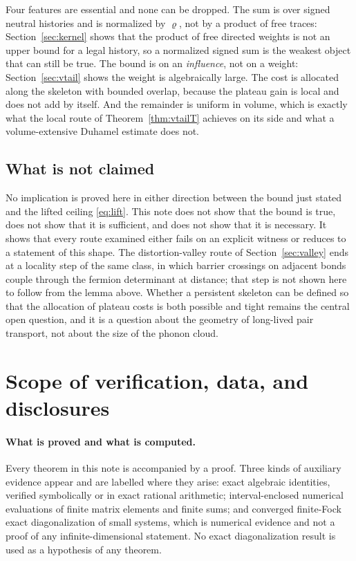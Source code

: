 \documentclass[11pt]{article}
\theoremstyle{definition}
\theoremstyle{remark}
\begin{document}
Four features are essential and none can be dropped. The sum is over signed
neutral histories and is normalized by $\varrho$, not by a product of free traces:
Section~\ref{sec:kernel} shows that the product of free directed weights is not an
upper bound for a legal history, so a normalized signed sum is the weakest object
that can still be true. The bound is on an \emph{influence}, not on a weight:
Section~\ref{sec:vtail} shows the weight is algebraically large. The cost is
allocated along the skeleton with bounded overlap, because the plateau gain is
local and does not add by itself. And the remainder is uniform in volume, which is
exactly what the local route of Theorem~\ref{thm:vtailT} achieves on its side and
what a volume-extensive Duhamel estimate does not.

\subsection{What is not claimed}

No implication is proved here in either direction between the bound just stated
and the lifted ceiling \eqref{eq:lift}. This note does not show that the bound is
true, does not show that it is sufficient, and does not show that it is necessary.
It shows that every route examined either fails on an explicit witness or reduces
to a statement of this shape. The distortion-valley route of
Section~\ref{sec:valley} ends at a locality step of the same class, in which
barrier crossings on adjacent bonds couple through the fermion determinant at
distance; that step is not shown here to follow from the lemma above. Whether a
persistent skeleton can be defined so that
the allocation of plateau costs is both possible and tight remains the central
open question, and it is a question about the geometry of long-lived pair
transport, not about the size of the phonon cloud.

\section{Scope of verification, data, and disclosures}
\label{sec:scope}

\paragraph{What is proved and what is computed.} Every theorem in this note is
accompanied by a proof. Three kinds of auxiliary evidence appear and are labelled
where they arise: exact algebraic identities, verified symbolically or in exact
rational arithmetic; interval-enclosed numerical evaluations of finite matrix
elements and finite sums; and converged finite-Fock exact diagonalization of small
systems, which is numerical evidence and not a proof of any infinite-dimensional
statement. No exact diagonalization result is used as a hypothesis of any theorem.
\end{document}
